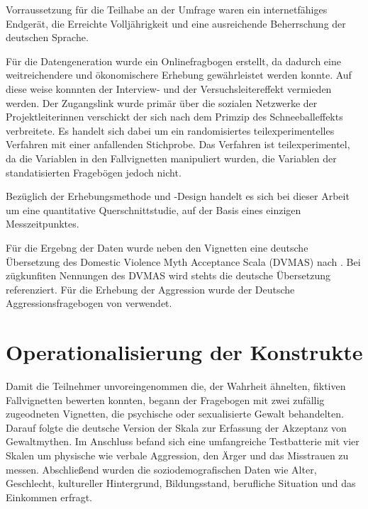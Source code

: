 Vorraussetzung für die Teilhabe an der Umfrage waren ein internetfähiges Endgerät, die Erreichte Volljährigkeit und eine ausreichende Beherrschung der deutschen Sprache. 

Für die Datengeneration wurde ein Onlinefragbogen erstellt, da dadurch eine weitreichendere und ökonomischere Erhebung gewährleistet werden konnte. Auf diese weise konnnten der Interview- und der Versuchsleitereffekt vermieden werden. Der Zugangslink wurde primär über die sozialen Netzwerke der Projektleiterinnen verschickt der sich nach dem Primzip des Schneeballeffekts verbreitete. Es handelt sich dabei um ein randomisiertes teilexperimentelles Verfahren mit einer anfallenden Stichprobe. Das Verfahren ist teilexperimentel, da die Variablen in den Fallvignetten manipuliert wurden, die Variablen der standatisierten Fragebögen jedoch nicht.

Bezüglich der Erhebungsmethode und -Design handelt es sich bei dieser Arbeit um eine quantitative Querschnittstudie, auf der Basis eines einzigen Messzeitpunktes.

Für die Ergebng der Daten wurde neben den Vignetten eine deutsche Übersetzung des Domestic Violence Myth Acceptance Scala (DVMAS) nach \textcite{Peters2003}. Bei zügkunfiten Nennungen des DVMAS wird stehts die deutsche Übersetzung referenziert. Für die Erhebung der Aggression wurde der Deutsche Aggressionsfragebogen von \textcite{Aggressionsfragebogen} verwendet.


\section{Operationalisierung der Konstrukte}    \label{sec_3.3}
Damit die Teilnehmer unvoreingenommen die, der Wahrheit ähnelten, fiktiven Fallvignetten bewerten konnten, begann der Fragebogen mit zwei zufällig zugeodneten Vignetten, die psychische oder sexualisierte Gewalt behandelten. Darauf folgte die deutsche Version der Skala zur Erfassung der Akzeptanz von Gewaltmythen. Im Anschluss befand sich eine umfangreiche Testbatterie mit vier Skalen um physische wie verbale Aggression, den Ärger und das Misstrauen zu messen. Abschließend wurden die soziodemografischen Daten wie Alter, Geschlecht, kultureller Hintergrund, Bildungsstand, berufliche Situation und das Einkommen erfragt.

